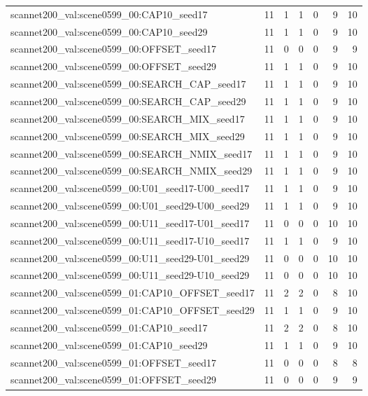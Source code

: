 \begin{table}[t]
\begin{tabular}{lrrrrrr}
scannet200\_val:scene0599\_00:CAP10\_seed17 & 11 & 1 & 1 & 0 & 9 & 10 \\
scannet200\_val:scene0599\_00:CAP10\_seed29 & 11 & 1 & 1 & 0 & 9 & 10 \\
scannet200\_val:scene0599\_00:OFFSET\_seed17 & 11 & 0 & 0 & 0 & 9 & 9 \\
scannet200\_val:scene0599\_00:OFFSET\_seed29 & 11 & 1 & 1 & 0 & 9 & 10 \\
scannet200\_val:scene0599\_00:SEARCH\_CAP\_seed17 & 11 & 1 & 1 & 0 & 9 & 10 \\
scannet200\_val:scene0599\_00:SEARCH\_CAP\_seed29 & 11 & 1 & 1 & 0 & 9 & 10 \\
scannet200\_val:scene0599\_00:SEARCH\_MIX\_seed17 & 11 & 1 & 1 & 0 & 9 & 10 \\
scannet200\_val:scene0599\_00:SEARCH\_MIX\_seed29 & 11 & 1 & 1 & 0 & 9 & 10 \\
scannet200\_val:scene0599\_00:SEARCH\_NMIX\_seed17 & 11 & 1 & 1 & 0 & 9 & 10 \\
scannet200\_val:scene0599\_00:SEARCH\_NMIX\_seed29 & 11 & 1 & 1 & 0 & 9 & 10 \\
scannet200\_val:scene0599\_00:U01\_seed17-U00\_seed17 & 11 & 1 & 1 & 0 & 9 & 10 \\
scannet200\_val:scene0599\_00:U01\_seed29-U00\_seed29 & 11 & 1 & 1 & 0 & 9 & 10 \\
scannet200\_val:scene0599\_00:U11\_seed17-U01\_seed17 & 11 & 0 & 0 & 0 & 10 & 10 \\
scannet200\_val:scene0599\_00:U11\_seed17-U10\_seed17 & 11 & 1 & 1 & 0 & 9 & 10 \\
scannet200\_val:scene0599\_00:U11\_seed29-U01\_seed29 & 11 & 0 & 0 & 0 & 10 & 10 \\
scannet200\_val:scene0599\_00:U11\_seed29-U10\_seed29 & 11 & 0 & 0 & 0 & 10 & 10 \\
scannet200\_val:scene0599\_01:CAP10\_OFFSET\_seed17 & 11 & 2 & 2 & 0 & 8 & 10 \\
scannet200\_val:scene0599\_01:CAP10\_OFFSET\_seed29 & 11 & 1 & 1 & 0 & 9 & 10 \\
scannet200\_val:scene0599\_01:CAP10\_seed17 & 11 & 2 & 2 & 0 & 8 & 10 \\
scannet200\_val:scene0599\_01:CAP10\_seed29 & 11 & 1 & 1 & 0 & 9 & 10 \\
scannet200\_val:scene0599\_01:OFFSET\_seed17 & 11 & 0 & 0 & 0 & 8 & 8 \\
scannet200\_val:scene0599\_01:OFFSET\_seed29 & 11 & 0 & 0 & 0 & 9 & 9 \\

\end{tabular}
\end{table}
